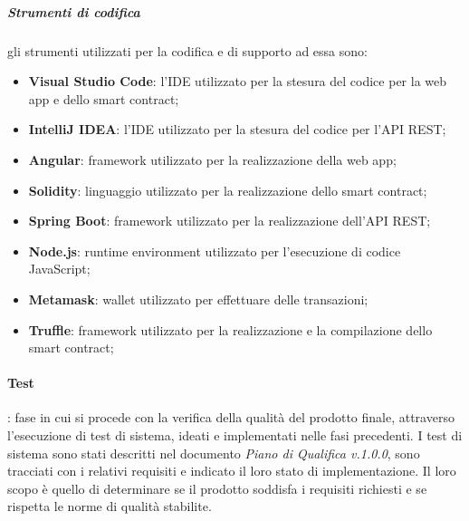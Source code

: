 \subparagraph{Strumenti di codifica} gli strumenti utilizzati per la codifica e di supporto ad essa sono:
\begin{itemize}
    \item \textbf{Visual Studio Code}: l'IDE utilizzato per la stesura del codice per la web app e dello smart contract;
    \item \textbf{IntelliJ IDEA}: l'IDE utilizzato per la stesura del codice per l'API REST;
    \item \textbf{Angular}: framework utilizzato per la realizzazione della web app;
    \item \textbf{Solidity}: linguaggio utilizzato per la realizzazione dello smart contract;
    \item \textbf{Spring Boot}: framework utilizzato per la realizzazione dell'API REST;
    \item \textbf{Node.js}: runtime environment utilizzato per l'esecuzione di codice JavaScript;
    \item \textbf{Metamask}: wallet utilizzato per effettuare delle transazioni;
    \item \textbf{Truffle}: framework utilizzato per la realizzazione e la compilazione dello smart contract;
\end{itemize}

\paragraph{Test}: fase in cui si procede con la verifica della qualità del prodotto finale, attraverso l'esecuzione di test di sistema, ideati e implementati nelle fasi precedenti. \newline
I test di sistema sono stati descritti nel documento \textit{Piano di Qualifica v.1.0.0}, sono tracciati con i relativi requisiti e indicato il loro stato di implementazione. \newline
Il loro scopo è quello di determinare se il prodotto soddisfa i requisiti richiesti e se rispetta le norme di qualità stabilite.

